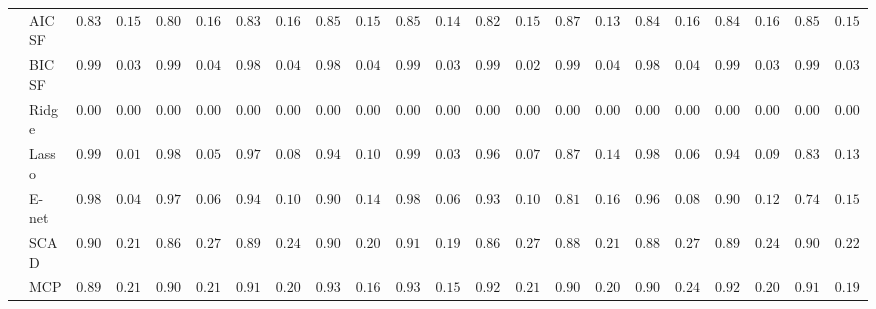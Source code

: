 \begin{tabular}{llllllllllllllllllllll}
	& AIC SF  & $0.8317$ & $0.1526$ & $0.8033$ & $0.1698$ & $0.8333$ & $0.1658$ & $0.8533$ & $0.1503$ & $0.8500$ & $0.1431$ & $0.8233$ & $0.1514$ & $0.8717$ & $0.1399$ & $0.8417$ & $0.1665$ & $0.8400$ & $0.1640$ & $0.8550$ & $0.1529$ \\
	& BIC SF  & $0.9917$ & $0.0365$ & $0.9900$ & $0.0463$ & $0.9883$ & $0.0489$ & $0.9867$ & $0.0454$ & $0.9900$ & $0.0398$ & $0.9950$ & $0.0286$ & $0.9917$ & $0.0435$ & $0.9883$ & $0.0489$ & $0.9917$ & $0.0365$ & $0.9917$ & $0.0365$ \\
	& Ridge  & $0.0000$ & $0.0000$ & $0.0000$ & $0.0000$ & $0.0000$ & $0.0000$ & $0.0000$ & $0.0000$ & $0.0000$ & $0.0000$ & $0.0000$ & $0.0000$ & $0.0000$ & $0.0000$ & $0.0000$ & $0.0000$ & $0.0000$ & $0.0000$ & $0.0000$ & $0.0000$ \\
	& Lasso  & $0.9983$ & $0.0167$ & $0.9850$ & $0.0535$ & $0.9733$ & $0.0811$ & $0.9467$ & $0.1056$ & $0.9917$ & $0.0365$ & $0.9683$ & $0.0738$ & $0.8717$ & $0.1457$ & $0.9800$ & $0.0682$ & $0.9467$ & $0.0914$ & $0.8300$ & $0.1381$ \\
	& E-net  & $0.9883$ & $0.0427$ & $0.9717$ & $0.0672$ & $0.9467$ & $0.1082$ & $0.9017$ & $0.1403$ & $0.9867$ & $0.0612$ & $0.9333$ & $0.1086$ & $0.8150$ & $0.1605$ & $0.9683$ & $0.0877$ & $0.9017$ & $0.1256$ & $0.7400$ & $0.1523$ \\
	& SCAD  & $0.9000$ & $0.2145$ & $0.8617$ & $0.2783$ & $0.8917$ & $0.2409$ & $0.9083$ & $0.2043$ & $0.9133$ & $0.1931$ & $0.8617$ & $0.2763$ & $0.8883$ & $0.2159$ & $0.8850$ & $0.2749$ & $0.8900$ & $0.2498$ & $0.9033$ & $0.2250$ \\
	& MCP  & $0.8983$ & $0.2144$ & $0.9083$ & $0.2176$ & $0.9133$ & $0.2017$ & $0.9317$ & $0.1626$ & $0.9350$ & $0.1533$ & $0.9250$ & $0.2137$ & $0.9050$ & $0.2096$ & $0.9000$ & $0.2404$ & $0.9200$ & $0.2044$ & $0.9133$ & $0.1946$ \\
	\hline 
\end{tabular}